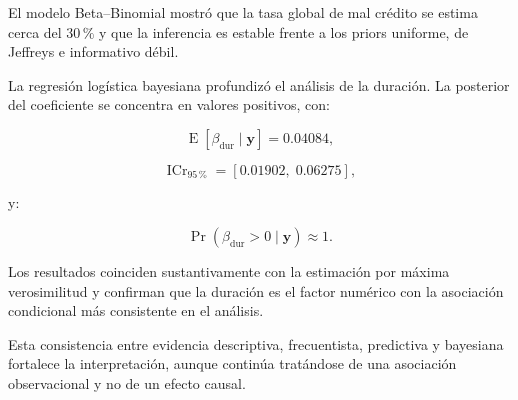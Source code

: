 El modelo Beta--Binomial mostró que la tasa global de mal crédito se
estima cerca del \(30\,\%\) y que la inferencia es estable frente a los
priors uniforme, de Jeffreys e informativo débil.

La regresión logística bayesiana profundizó el análisis de la duración.
La posterior del coeficiente se concentra en valores positivos, con:

\[
\operatorname{E}
\left[
    \beta_{\mathrm{dur}}
    \mid
    \mathbf{y}
\right]
=
0.04084,
\]

\[
\operatorname{ICr}_{95\,\%}
=
[0.01902,\;0.06275],
\]

y:

\[
\Pr
\left(
    \beta_{\mathrm{dur}}>0
    \mid
    \mathbf{y}
\right)
\approx
1.
\]

Los resultados coinciden sustantivamente con la estimación por máxima
verosimilitud y confirman que la duración es el factor numérico con la
asociación condicional más consistente en el análisis.

Esta consistencia entre evidencia descriptiva, frecuentista, predictiva y
bayesiana fortalece la interpretación, aunque continúa tratándose de una
asociación observacional y no de un efecto causal.

